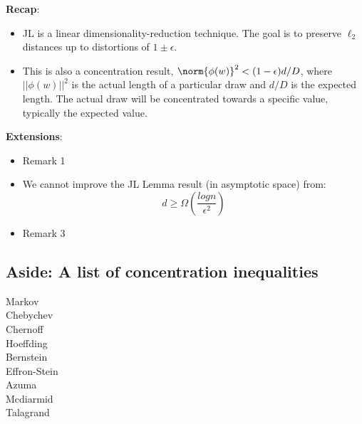 \noindent\textbf{Recap}: 

\begin{itemize}
\item JL is a linear dimensionality-reduction technique. The goal is
  to preserve $\ell_{2}$ distances up to distortions of $1\pm
  \epsilon$. 

\item This is also a concentration result, $\norm{\phi(w)}^{2} <
  (1-\epsilon)d/D$, where $||\phi(w)||^{2}$ is the actual length of a
  particular draw and $d/D$ is the expected length. The actual draw
  will be concentrated towards a specific value, typically the
  expected value.  

\end{itemize}

\textbf{Extensions}:
\begin{itemize}
  \item Remark 1
  \item We cannot improve the JL Lemma result (in asymptotic space) from:
  $$d \geq \Omega(\frac{log n}{\epsilon^2})$$
  \item Remark 3
\end{itemize}

\subsection{Aside: A list of concentration inequalities}
\begin{centering}
Markov \\
Chebychev \\
Chernoff \\
Hoeffding \\
Bernstein \\
Effron-Stein \\
Azuma \\
Mcdiarmid \\
Talagrand \\
\end{centering}
